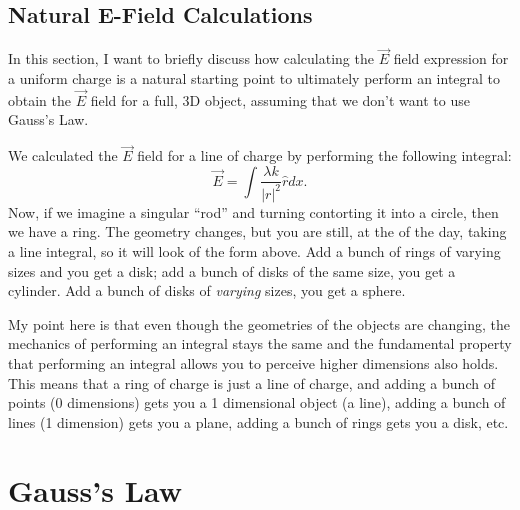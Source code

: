 \documentclass[12pt]{extreport}
\begin{document}
\section{Natural E-Field Calculations}
In this section, I want to briefly discuss how calculating the $\vec E$ field expression for a uniform charge is a natural starting point to ultimately perform an integral to obtain the $\vec E$ field for a full, 3D object, assuming that we don't want to use Gauss's Law.

We calculated the $\vec E$ field for a line of charge by performing the following integral: $$\vec E = \int \frac{\lambda k}{|r|^2} \hat r dx.$$ Now, if we imagine a singular ``rod'' and turning contorting it into a circle, then we have a ring. The geometry changes, but you are still, at the of the day, taking a line integral, so it will look of the form above. Add a bunch of rings of varying sizes and you get a disk; add a bunch of disks of the same size, you get a cylinder. Add a bunch of disks of \textit{varying} sizes, you get a sphere. 

My point here is that even though the geometries of the objects are changing, the mechanics of performing an integral stays the same and the fundamental property that performing an integral allows you to perceive higher dimensions also holds. This means that a ring of charge is just a line of charge, and adding a bunch of points (0 dimensions) gets you a 1 dimensional object (a line), adding a bunch of lines (1 dimension) gets you a plane, adding a bunch of rings gets you a disk, etc.




\chapter{Gauss's Law}
\end{document}
